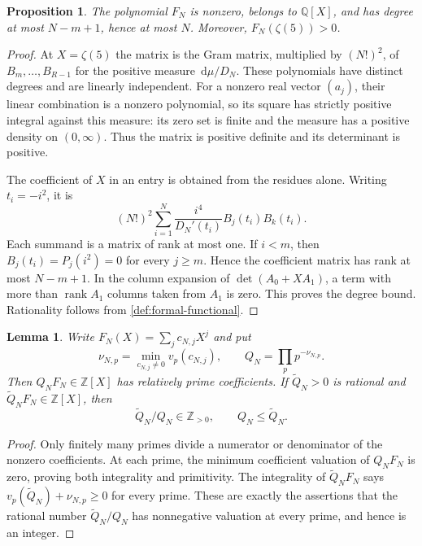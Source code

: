 \documentclass[11pt,letterpaper]{article}
\newtheorem{lemma}[lemma]{Lemma}
\newtheorem{proposition}[proposition]{Proposition}
\theoremstyle{definition}
\newcommand{\Q}{\mathbb Q}
\newcommand{\Z}{\mathbb Z}
\newcommand{\dd}{\,\mathrm d}
\DeclareMathOperator{\rank}{rank}
\begin{document}
\begin{proposition}\label{prop:gram-pencil}
The polynomial $F_N$ is nonzero, belongs to $\Q[X]$, and has degree at
most $N-m+1$, hence at most $N$. Moreover,
$F_N(\zeta(5))>0$.
\end{proposition}
\begin{proof}
At $X=\zeta(5)$ the matrix is the Gram matrix, multiplied by $(N!)^2$,
of $B_m,\ldots,B_{R-1}$ for the positive measure $\dd\mu/D_N$.
These polynomials have distinct degrees and are linearly independent.
For a nonzero real vector $(a_j)$, their linear combination is a
nonzero polynomial, so its square has strictly positive integral against
this measure: its zero set is finite and the measure has a positive
density on $(0,\infty)$. Thus the matrix is positive definite and its
determinant is positive.

The coefficient of $X$ in an entry is obtained from the residues alone.
Writing $t_i=-i^2$, it is
\[
 (N!)^2\sum_{i=1}^N
 \frac{i^4}{D_N'(t_i)}B_j(t_i)B_k(t_i).
\]
Each summand is a matrix of rank at most one. If $i<m$, then
$B_j(t_i)=P_j(i^2)=0$ for every $j\ge m$. Hence the coefficient matrix
has rank at most $N-m+1$. In the column expansion of
$\det(A_0+XA_1)$, a term with more than $\rank A_1$ columns taken
from $A_1$ is zero. This proves the degree bound. Rationality follows
from \cref{def:formal-functional}.
\end{proof}

\begin{lemma}\label{lem:primitive-normalizer}
Write $F_N(X)=\sum_j c_{N,j}X^j$ and put
\begin{equation}\label{eq:primitive-normalizer}
 \nu_{N,p}=\min_{c_{N,j}\ne0}v_p(c_{N,j}),\qquad
 Q_N=\prod_p p^{-\nu_{N,p}}.
\end{equation}
Then $Q_NF_N\in\Z[X]$ has relatively prime coefficients. If
$\widetilde Q_N>0$ is rational and
$\widetilde Q_NF_N\in\Z[X]$, then
\begin{equation}\label{eq:minimal-normalizer}
 \widetilde Q_N/Q_N\in\Z_{>0},\qquad Q_N\le\widetilde Q_N.
\end{equation}
\end{lemma}
\begin{proof}
Only finitely many primes divide a numerator or denominator of the
nonzero coefficients. At each prime, the minimum coefficient valuation
of $Q_NF_N$ is zero, proving both integrality and primitivity.
The integrality of $\widetilde Q_NF_N$ says
$v_p(\widetilde Q_N)+\nu_{N,p}\ge0$ for every prime. These are exactly
the assertions that the rational number $\widetilde Q_N/Q_N$ has
nonnegative valuation at every prime, and hence is an integer.
\end{proof}
\end{document}
